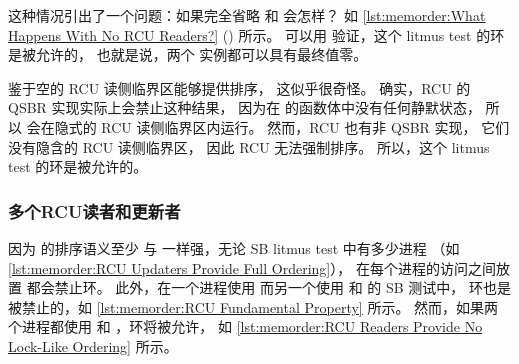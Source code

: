 \begin{listing}

\caption{没有RCU读者会怎样？}
\label{lst:memorder:What Happens With No RCU Readers?}
\end{listing}

这种情况引出了一个问题：如果完全省略
 和  会怎样？
如 \cref{lst:memorder:What Happens With No RCU Readers?}
() 所示。
可以用  验证，这个 litmus test 的环是被允许的，
也就是说，两个  实例都可以具有最终值零。

鉴于空的 RCU 读侧临界区能够提供排序，
这似乎很奇怪。
确实，RCU 的 QSBR 实现实际上会禁止这种结果，
因为在  的函数体中没有任何静默状态，
所以  会在隐式的 RCU 读侧临界区内运行。
然而，RCU 也有非 QSBR 实现，
它们没有隐含的 RCU 读侧临界区，
因此 RCU 无法强制排序。
所以，这个 litmus test 的环是被允许的。

\QuickQuizEnd

\subsubsection{多个RCU读者和更新者}
\label{sec:memorder:Multiple RCU Readers and Updaters}

因为  的排序语义至少
与  一样强，无论 SB litmus test 中有多少进程
（如 \cref{lst:memorder:RCU Updaters Provide Full Ordering}），
在每个进程的访问之间放置 
都会禁止环。
此外，在一个进程使用  而另一个使用
 和  的 SB 测试中，
环也是被禁止的，如 \cref{lst:memorder:RCU Fundamental Property} 所示。
然而，如果两个进程都使用  和
，环将被允许，
如 \cref{lst:memorder:RCU Readers Provide No Lock-Like Ordering} 所示。

